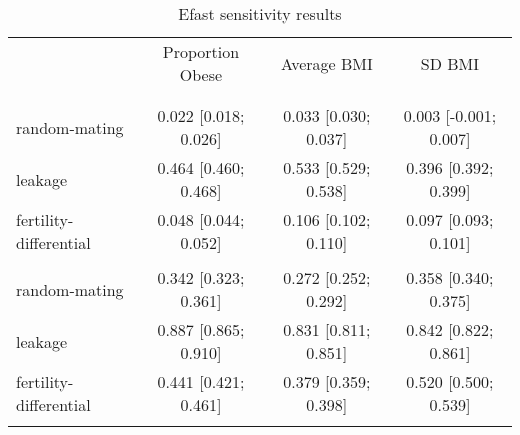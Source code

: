 
\begin{table}[htp]
\caption{Efast sensitivity results}
\label{tab:sensitivity}
\footnotesize
\centering
\begin{tabular}{lccc}
\hline
\addlinespace
& Proportion Obese & Average BMI & SD BMI \\
\addlinespace
\hline
\addlinespace
\multicolumn{4}{l}{\textbf{Scenario 2}} \\
\addlinespace[6pt]
\multicolumn{4}{l}{\hspace{1em} S1} \\
\hspace{1.5em} random-mating & 0.022 [0.018; 0.026] & 0.033 [0.030; 0.037] & 0.003 [-0.001; 0.007]\\ 
	\hspace{1.5em} leakage & 0.464 [0.460; 0.468] & 0.533 [0.529; 0.538] & 0.396 [0.392; 0.399]\\ 
	\hspace{1.5em} fertility-differential & 0.048 [0.044; 0.052] & 0.106 [0.102; 0.110] & 0.097 [0.093; 0.101]\\
\addlinespace[12pt]
\multicolumn{4}{l}{\hspace{1em} ST} \\ 
\hspace{1.5em} random-mating & 0.342 [0.323; 0.361] & 0.272 [0.252; 0.292] & 0.358 [0.340; 0.375]\\ 
	\hspace{1.5em} leakage & 0.887 [0.865; 0.910] & 0.831 [0.811; 0.851] & 0.842 [0.822; 0.861]\\ 
	\hspace{1.5em} fertility-differential & 0.441 [0.421; 0.461] & 0.379 [0.359; 0.398] & 0.520 [0.500; 0.539]\\ 
\addlinespace
\hline
\end{tabular}
\end{table}